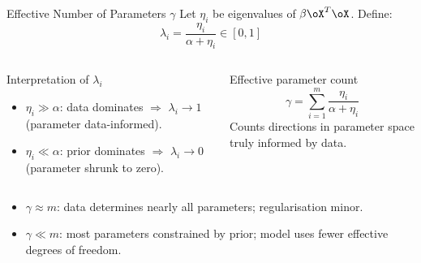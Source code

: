 \begin{frame}{Effective Number of Parameters $\gamma$}
  Let $\eta_i$ be eigenvalues of $\beta\oX^T\oX$. Define:
  \[
    \lambda_i = \frac{\eta_i}{\alpha+\eta_i} \in [0,1]
  \]
  \begin{columns}[T]
  \begin{block}{Interpretation of $\lambda_i$}
    \begin{itemize}
      \item $\eta_i\gg\alpha$: data dominates $\Rightarrow$ $\lambda_i\to 1$ (parameter data-informed).
      \item $\eta_i\ll\alpha$: prior dominates $\Rightarrow$ $\lambda_i\to 0$ (parameter shrunk to zero).
    \end{itemize}
  \end{block}
  \begin{block}{Effective parameter count}
    \[
      \gamma = \sum_{i=1}^m \frac{\eta_i}{\alpha+\eta_i}
    \]
    Counts directions in parameter space truly informed by data.
  \end{block}
  \end{columns}
  \vspace{.3em}
  \begin{itemize}
    \item $\gamma\approx m$: data determines nearly all parameters; regularisation minor.
    \item $\gamma\ll m$: most parameters constrained by prior; model uses fewer effective degrees of freedom.
  \end{itemize}
\end{frame}

